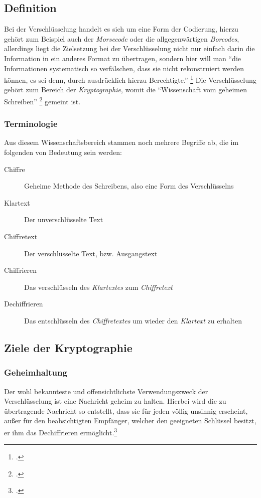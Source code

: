 \documentclass{scrarticle} %
\begin{document}
    \subsection{Definition}
    Bei der Verschlüsselung handelt es sich um eine Form der Codierung, hierzu gehört zum Beispiel auch der \emph{Morsecode} oder die allgegenwärtigen \emph{Borcodes}, allerdings liegt die Zielsetzung bei der Verschlüsselung nicht nur einfach darin die Information in ein anderes Format zu übertragen, sondern hier will man \enquote{die Informationen systematisch so verfälschen, dass sie nicht rekonstruiert werden können, es sei denn, durch ausdrücklich hierzu Berechtigte.} \footcite[263]{dankmeier2006}
    Die Verschlüsselung gehört zum Bereich der \emph{Kryptographie}, womit die \enquote{Wissenschaft vom geheimen Schreiben} \footcite[1]{watjen2008} gemeint ist.

    \subsubsection{Terminologie}
    Aus diesem Wissenschaftsbereich stammen noch mehrere Begriffe ab, die im folgenden von Bedeutung sein werden:
    \begin{description}
        \item[Chiffre] Geheime Methode des Schreibens, also eine Form des Verschlüsselns
        \item[Klartext] Der unverschlüsselte Text
        \item[Chiffretext] Der verschlüsselte Text, bzw. Ausgangstext
        \item[Chiffrieren] Das verschlüsseln des \emph{Klartextes} zum \emph{Chiffretext}
        \item[Dechiffrieren] Das entschlüsseln des \emph{Chiffretextes} um wieder den \emph{Klartext} zu erhalten
    \end{description}

    \subsection[Ziele]{Ziele der Kryptographie}
    \subsubsection{Geheimhaltung}
    Der wohl bekannteste und offensichtlichste Verwendungszweck der Verschlüsselung ist eine Nachricht geheim zu halten. Hierbei wird die zu übertragende Nachricht so entstellt, dass sie für jeden völlig unsinnig erscheint, außer für den beabsichtigten Empfänger, welcher den geeigneten Schlüssel besitzt, er ihm das Dechiffrieren ermöglicht.\footcite{beutelspacher2015}
\end{document}
